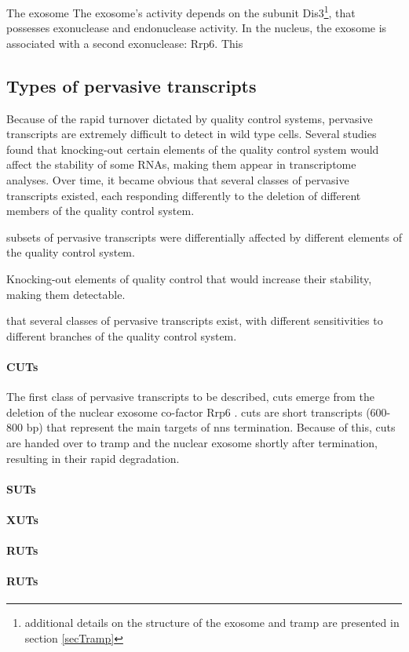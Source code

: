 The exosome 
The exosome's activity depends on the subunit Dis3\footnote{additional details on the structure of the exosome and \gls{tramp} are presented in section \ref{secTramp}}, that possesses \TtoF{} exonuclease and endonuclease activity.
In the nucleus, the exosome is associated with a second \TtoF{} exonuclease: Rrp6. This 



\subsection{Types of pervasive transcripts}

Because of the rapid turnover dictated by quality control systems, pervasive transcripts are extremely difficult to detect in wild type cells.
Several studies found that knocking-out certain elements of the quality control system would affect the stability of some RNAs, making them appear in transcriptome analyses.
Over time, it became obvious that several classes of pervasive transcripts existed, each responding differently to the deletion of different members of the quality control system.



subsets of pervasive transcripts were differentially affected by different elements of the quality control system.


Knocking-out elements of quality control that would increase their stability, making them detectable.



 that several classes of pervasive transcripts exist, with different sensitivities to different branches of the quality control system.


\paragraph{CUTs}

The first class of pervasive transcripts to be described, \gls{cuts} emerge from the deletion of the nuclear exosome co-factor Rrp6 \cite{wyers:2005:cryptic}.
\gls{cuts} are short transcripts (600-800 bp) that represent the main targets of \gls{nns} termination.
Because of this, \gls{cuts} are handed over to \gls{tramp} and the nuclear exosome shortly after termination, resulting in their rapid degradation. 

\paragraph{SUTs}



\paragraph{XUTs}


\paragraph{RUTs}


\paragraph{RUTs}




